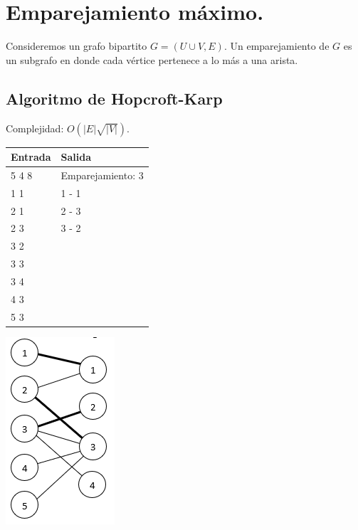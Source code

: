 \documentclass[12pt, letterpaper, twoside]{article}
\begin{document}
\newpage

\section{Emparejamiento máximo.}

Consideremos un grafo bipartito $G = (U \cup V, E)$. Un emparejamiento de $G$ es un subgrafo en donde cada vértice pertenece a lo más a una arista.

\subsection{Algoritmo de Hopcroft-Karp}

Complejidad: $O(|E|\sqrt{|V|})$.

 \medskip

\begin{tabular}{|p{7cm}|p{7cm}|}
\hline
\textbf{Entrada} & \textbf{Salida}\\ \hline
5 4 8 & Emparejamiento: 3\\
1 1   & 1 - 1\\
2 1   & 2 - 3\\
2 3   & 3 - 2\\
3 2   & \\
3 3   & \\
3 4   & \\
4 3   & \\
5 3   & \\ \hline
\end{tabular} \newpage

\begin{center}
\includegraphics[height = 0.3\textheight]{MaxMatching.png}	
\end{center}

\newpage
\end{document}

